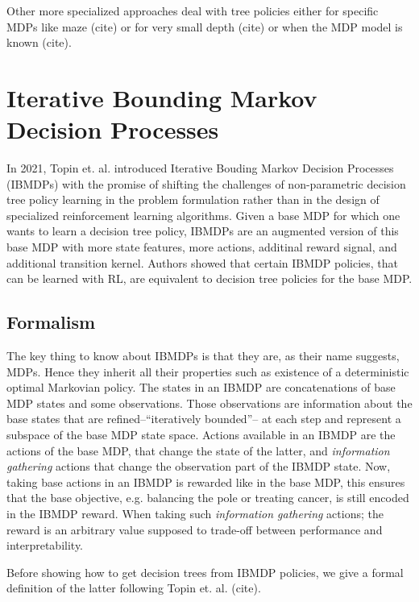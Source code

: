 Other more specialized approaches deal with tree policies either for specific MDPs like maze (cite) or for very small depth (cite) or when the MDP model is known (cite).
\section{Iterative Bounding Markov Decision Processes}
In 2021, Topin et. al. introduced Iterative Bouding Markov Decision Processes (IBMDPs) with the promise of shifting the challenges of non-parametric decision tree policy learning in the problem formulation rather than in the design of specialized reinforcement learning algorithms.
Given a base MDP for which one wants to learn a decision tree policy, IBMDPs are an augmented version of this base MDP with more state features, more actions, additinal reward signal, and additional transition kernel.
Authors showed that certain IBMDP policies, that can be learned with RL, are equivalent to decision tree policies for the base MDP. 
\subsection{Formalism}
The key thing to know about IBMDPs is that they are, as their name suggests, MDPs. Hence they inherit all their properties such as existence of a deterministic optimal Markovian policy.
The states in an IBMDP are concatenations of base MDP states and some observations. Those observations are information about the base states that are refined--``iteratively bounded''-- at each step and represent a subspace of the base MDP state space.
Actions available in an IBMDP are the actions of the base MDP, that change the state of the latter, and \textit{information gathering} actions that change the observation part of the IBMDP state.
Now, taking base actions in an IBMDP is rewarded like in the base MDP, this ensures that the base objective, e.g. balancing the pole or treating cancer, is still encoded in the IBMDP reward. When taking such \textit{information gathering} actions; the reward is an arbitrary value supposed to trade-off between performance and interpretability.
 
Before showing how to get decision trees from IBMDP policies, we give a formal definition of the latter following Topin et. al. (cite).

